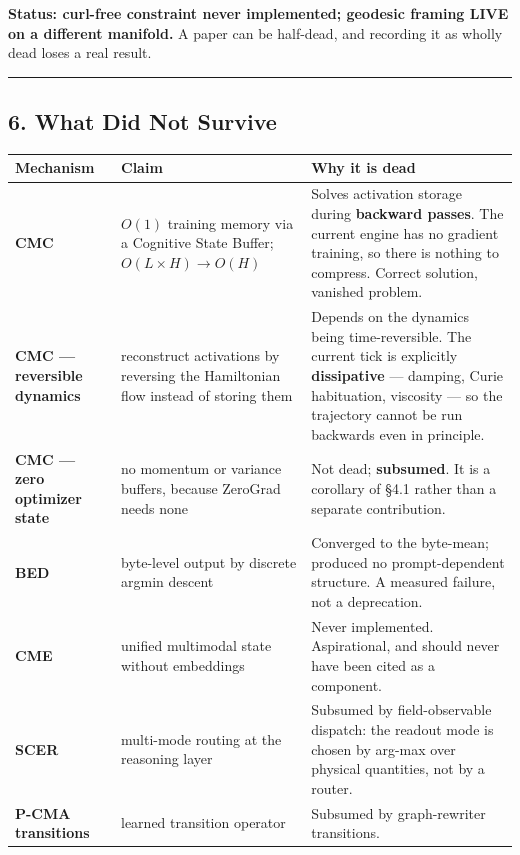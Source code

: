 \documentclass[
  11pt,
  a4paper,
]{article}
\begin{document}
\textbf{Status: curl-free constraint never implemented; geodesic framing
LIVE on a different manifold.} A paper can be half-dead, and recording
it as wholly dead loses a real result.

\begin{center}\rule{0.5\linewidth}{0.5pt}\end{center}

\subsection{6. What Did Not Survive}\label{what-did-not-survive}

\begin{longtable}[]{@{}
  >{\raggedright\arraybackslash}p{}
  >{\raggedright\arraybackslash}p{}
  >{\raggedright\arraybackslash}p{}@{}}
\toprule\noalign{}
\begin{minipage}[b]{\linewidth}\raggedright
Mechanism
\end{minipage} & \begin{minipage}[b]{\linewidth}\raggedright
Claim
\end{minipage} & \begin{minipage}[b]{\linewidth}\raggedright
Why it is dead
\end{minipage} \\
\midrule\noalign{}
\endhead
\bottomrule\noalign{}
\endlastfoot
\textbf{CMC} & \(O(1)\) training memory via a Cognitive State Buffer;
\(O(L \times H) \to O(H)\) & Solves activation storage during
\textbf{backward passes}. The current engine has no gradient training,
so there is nothing to compress. Correct solution, vanished problem. \\
\textbf{CMC --- reversible dynamics} & reconstruct activations by
reversing the Hamiltonian flow instead of storing them & Depends on the
dynamics being time-reversible. The current tick is explicitly
\textbf{dissipative} --- damping, Curie habituation, viscosity --- so
the trajectory cannot be run backwards even in principle. \\
\textbf{CMC --- zero optimizer state} & no momentum or variance buffers,
because ZeroGrad needs none & Not dead; \textbf{subsumed}. It is a
corollary of §4.1 rather than a separate contribution. \\
\textbf{BED} & byte-level output by discrete argmin descent & Converged
to the byte-mean; produced no prompt-dependent structure. A measured
failure, not a deprecation. \\
\textbf{CME} & unified multimodal state without embeddings & Never
implemented. Aspirational, and should never have been cited as a
component. \\
\textbf{SCER} & multi-mode routing at the reasoning layer & Subsumed by
field-observable dispatch: the readout mode is chosen by arg-max over
physical quantities, not by a router. \\
\textbf{P-CMA transitions} & learned transition operator & Subsumed by
graph-rewriter transitions. \\
\end{longtable}
\end{document}
